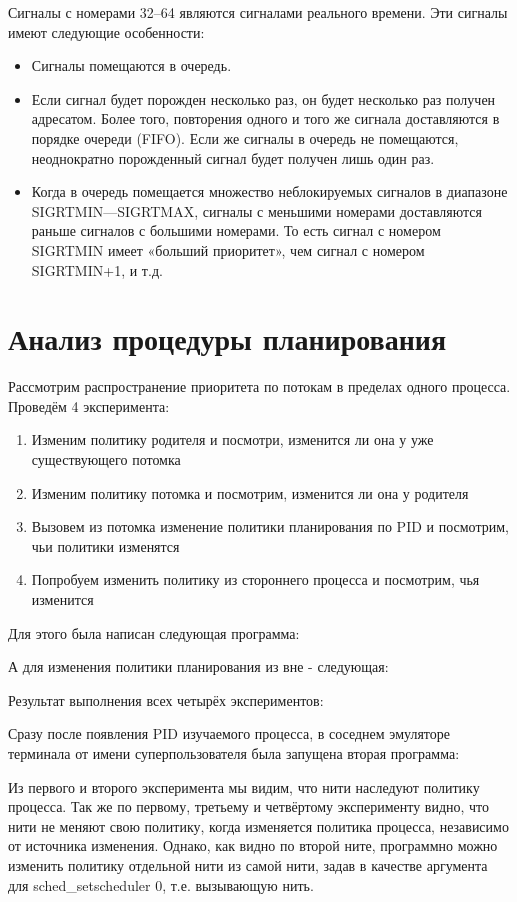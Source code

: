 \documentclass[a4paper]{article}
\begin{document}
	Сигналы с номерами 32--64 являются сигналами реального времени. Эти сигналы имеют следующие особенности:
	\begin{itemize}
		\item Сигналы помещаются в очередь.
		\item Если сигнал будет порожден несколько раз, он будет несколько раз получен адресатом. Более того, повторения одного и того же сигнала доставляются в порядке очереди (FIFO). Если же сигналы в очередь не помещаются, неоднократно порожденный сигнал будет получен лишь один раз.
		\item Когда в очередь помещается множество неблокируемых сигналов в диапазоне SIGRTMIN—SIGRTMAX, сигналы с меньшими номерами доставляются раньше сигналов с большими номерами. То есть сигнал с номером SIGRTMIN имеет «больший приоритет», чем сигнал с номером SIGRTMIN+1, и т.д.
	\end{itemize}

	\section{Анализ процедуры планирования}
	Рассмотрим распространение приоритета по потокам в пределах одного процесса. Проведём 4 эксперимента:
\begin{enumerate}
	\item Изменим политику родителя и посмотри, изменится ли она у уже существующего потомка
	\item Изменим политику потомка и посмотрим, изменится ли она у родителя
	\item Вызовем из потомка изменение политики планирования по PID и посмотрим, чьи политики изменятся
	\item Попробуем изменить политику из стороннего процесса и посмотрим, чья изменится
\end{enumerate}		
	 Для этого была написан следующая программа:
	
	А для изменения политики планирования из вне - следующая:
	
	Результат выполнения всех четырёх экспериментов:
	
	Сразу после появления PID изучаемого процесса, в соседнем эмуляторе терминала от имени суперпользователя была запущена вторая программа:
	
	Из первого и второго эксперимента мы видим, что нити наследуют политику процесса. Так же по первому, третьему и четвёртому эксперименту видно, что нити не меняют свою политику, когда изменяется политика процесса, независимо от источника изменения. Однако, как видно по второй ните, программно можно изменить политику отдельной нити из самой нити, задав в качестве аргумента для sched\_setscheduler 0, т.е. вызывающую нить.
\end{document}

